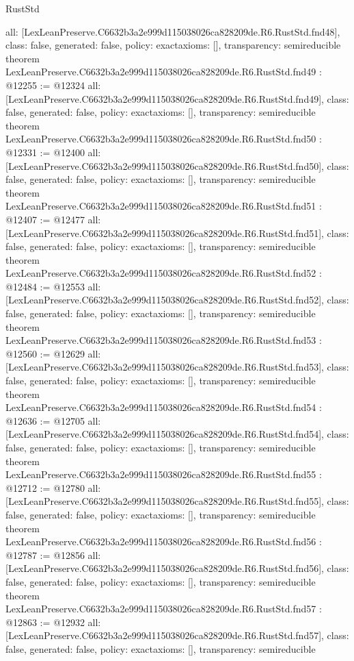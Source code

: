 \begin{lexlean}{RustStd}
\begin{coremodule}
{  all: [LexLeanPreserve.C6632b3a2e999d115038026ca828209de.R6.RustStd.fnd48],
  class: false,
  generated: false,
  policy: exact{axioms: []},
  transparency: semireducible
}
theorem LexLeanPreserve.C6632b3a2e999d115038026ca828209de.R6.RustStd.fnd49 : @12255 := @12324 {
  all: [LexLeanPreserve.C6632b3a2e999d115038026ca828209de.R6.RustStd.fnd49],
  class: false,
  generated: false,
  policy: exact{axioms: []},
  transparency: semireducible
}
theorem LexLeanPreserve.C6632b3a2e999d115038026ca828209de.R6.RustStd.fnd50 : @12331 := @12400 {
  all: [LexLeanPreserve.C6632b3a2e999d115038026ca828209de.R6.RustStd.fnd50],
  class: false,
  generated: false,
  policy: exact{axioms: []},
  transparency: semireducible
}
theorem LexLeanPreserve.C6632b3a2e999d115038026ca828209de.R6.RustStd.fnd51 : @12407 := @12477 {
  all: [LexLeanPreserve.C6632b3a2e999d115038026ca828209de.R6.RustStd.fnd51],
  class: false,
  generated: false,
  policy: exact{axioms: []},
  transparency: semireducible
}
theorem LexLeanPreserve.C6632b3a2e999d115038026ca828209de.R6.RustStd.fnd52 : @12484 := @12553 {
  all: [LexLeanPreserve.C6632b3a2e999d115038026ca828209de.R6.RustStd.fnd52],
  class: false,
  generated: false,
  policy: exact{axioms: []},
  transparency: semireducible
}
theorem LexLeanPreserve.C6632b3a2e999d115038026ca828209de.R6.RustStd.fnd53 : @12560 := @12629 {
  all: [LexLeanPreserve.C6632b3a2e999d115038026ca828209de.R6.RustStd.fnd53],
  class: false,
  generated: false,
  policy: exact{axioms: []},
  transparency: semireducible
}
theorem LexLeanPreserve.C6632b3a2e999d115038026ca828209de.R6.RustStd.fnd54 : @12636 := @12705 {
  all: [LexLeanPreserve.C6632b3a2e999d115038026ca828209de.R6.RustStd.fnd54],
  class: false,
  generated: false,
  policy: exact{axioms: []},
  transparency: semireducible
}
theorem LexLeanPreserve.C6632b3a2e999d115038026ca828209de.R6.RustStd.fnd55 : @12712 := @12780 {
  all: [LexLeanPreserve.C6632b3a2e999d115038026ca828209de.R6.RustStd.fnd55],
  class: false,
  generated: false,
  policy: exact{axioms: []},
  transparency: semireducible
}
theorem LexLeanPreserve.C6632b3a2e999d115038026ca828209de.R6.RustStd.fnd56 : @12787 := @12856 {
  all: [LexLeanPreserve.C6632b3a2e999d115038026ca828209de.R6.RustStd.fnd56],
  class: false,
  generated: false,
  policy: exact{axioms: []},
  transparency: semireducible
}
theorem LexLeanPreserve.C6632b3a2e999d115038026ca828209de.R6.RustStd.fnd57 : @12863 := @12932 {
  all: [LexLeanPreserve.C6632b3a2e999d115038026ca828209de.R6.RustStd.fnd57],
  class: false,
  generated: false,
  policy: exact{axioms: []},
  transparency: semireducible
}
\end{coremodule}
\end{lexlean}
